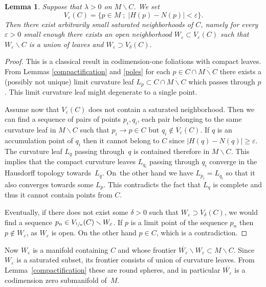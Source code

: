 \documentclass[JEP,XML,SOM,Unicode]{cedram}
\let\moins\smallsetminus
\let\epsilon\varepsilon
\newcommand{\sep}{\;;\;}
\newtheorem{lemma}[theorem]{Lemma}
\theoremstyle{definition}
\theoremstyle{remark}
\numberwithin{equation}{section}
\begin{document}
\begin{lemma}\label{saturated}
Suppose that $\lambda> 0$ on $M\moins C$. We set $$V_{\epsilon}(C)=\{p\in M\sep |H(p)-N(p)| < \epsilon\}.$$
Then there exist arbitrarily small saturated neighborhoods of $C$, namely for every $\varepsilon >0$ small enough
there exists an open neighborhood $W_{\varepsilon}\subset V_{\varepsilon}(C)$ such that $W_{\varepsilon}\moins C$ is a union of leaves and
$W_{\varepsilon}\supset V_{\delta}(C)$.
\end{lemma}
\begin{proof}
This is a classical result in codimension-one foliations with compact leaves.
From Lemmas \ref{compactification} and \ref{poles} for each
$p\in C\cap \overline{M\moins C}$ there exists a (possibly not unique) limit curvature leaf $L_p\subset C\cap \overline{M\moins C}$ which passes through $p$.
This limit curvature leaf might degenerate to a single point.

Assume now that $V_{\varepsilon}(C)$ does not contain a saturated neighborhood. Then
we can find a sequence of pairs of points $p_i,q_i$, each pair belonging to the
same curvature leaf in $M\moins C$ such that $p_i\to p\in C$ but
$q_i\not\in V_{\varepsilon}(C)$. If $q$ is an accumulation point of $q_i$ then it cannot belong to $C$ since $|H(q)-N(q)| \geq \varepsilon$. The curvature leaf $L_q$ passing
through~$q$ is contained therefore in $M\moins C$. This implies that
the compact curvature leaves $L_{q_i}$ passing through $q_i$ converge
in the Hausdorff topology towards~$L_q$.
On~the other hand we have
$L_{p_i}=L_{q_i}$ so that it also converges towards some $L_p$.
This contradicts the fact that
$L_q$ is complete and thus it cannot contain points from $C$.

Eventually, if there does not exist some $\delta>0$ such that $W_{\varepsilon}\supset V_{\delta}(C)$,
we would find a sequence $p_n\in V_{\sfrac{1}{n}}(C)\moins W_{\varepsilon}$. If $p$ is a limit point of the sequence $p_n$ then
$p\not\in W_{\varepsilon}$, as $W_{\varepsilon}$ is open. On the other hand $p\in C$, which is a contradiction.
\end{proof}

Now $W_{\varepsilon}$ is a manifold containing $C$ and whose frontier
$\overline{W_{\varepsilon}}\moins W_{\varepsilon}\subset M\moins C$.
Since $W_{\varepsilon}$ is a saturated subset, its frontier consists of union of curvature leaves.
From Lemma~\ref{compactification} these are round spheres, and in particular $\overline{W_{\varepsilon}}$ is
a codimension zero submanifold of~$M$.
\end{document}
